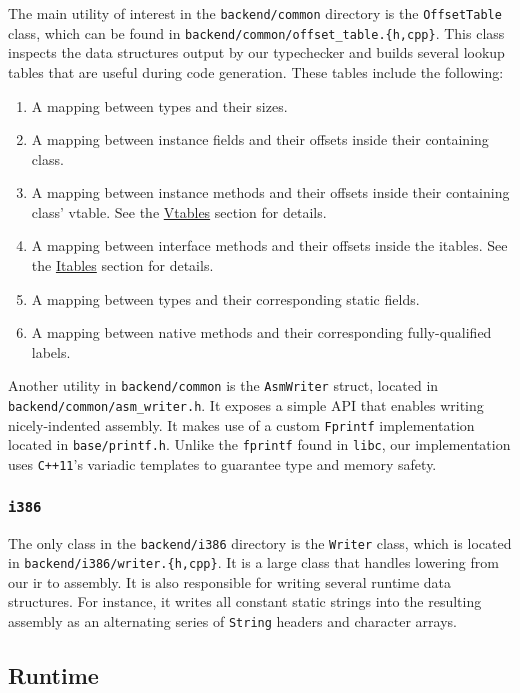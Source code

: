 \documentclass[12pt, titlepage]{article}
\newcommand{\z}[1]{\texttt{#1}}
\begin{document}
The main utility of interest in the \z{backend/common} directory is the
\z{OffsetTable} class, which can be found in
\z{backend/common/offset\_table.\{h,cpp\}}. This class inspects the data
structures output by our typechecker and builds several lookup tables that are
useful during code generation. These tables include the following:
\begin{enumerate}
  \item A mapping between types and their sizes.
  \item A mapping between instance fields and their offsets inside their
    containing class.
  \item A mapping between instance methods and their offsets inside their
    containing class' vtable. See the \hyperref[subsubsec:vtables]{Vtables}
    section for details.
  \item A mapping between interface methods and their offsets inside the
    itables. See the \hyperref[subsubsec:itables]{Itables} section for details.
  \item A mapping between types and their corresponding static fields.
  \item A mapping between native methods and their corresponding
    fully-qualified labels.
\end{enumerate}

Another utility in \z{backend/common} is the \z{AsmWriter} struct, located in
\\\z{backend/common/asm\_writer.h}. It exposes a simple API that enables writing
nicely-indented assembly. It makes use of a custom \z{Fprintf} implementation
located in \z{base/printf.h}. Unlike the \z{fprintf} found in \z{libc}, our
implementation uses \z{C++11}'s variadic templates to guarantee type and memory
safety.

\subsubsection{\z{i386}}\label{subsubsec:i386}

The only class in the \z{backend/i386} directory is the \z{Writer} class, which
is located in \z{backend/i386/writer.\{h,cpp\}}. It is a large class that
handles lowering from our \ac{ir} to assembly. It is also responsible for
writing several runtime data structures. For instance, it writes all constant
static strings into the resulting assembly as an alternating series of
\z{String} headers and character arrays.

\subsection{Runtime}\label{subsec:runtime}
\end{document}

